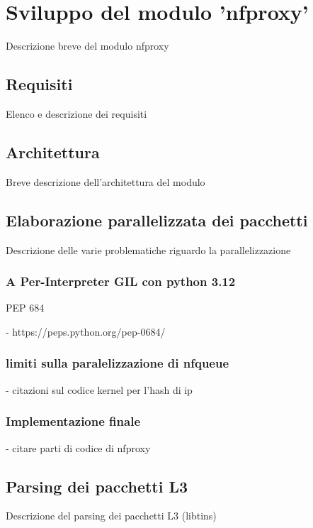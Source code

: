 \chapter{Sviluppo del modulo 'nfproxy'}

Descrizione breve del modulo nfproxy

\section{Requisiti}

Elenco e descrizione dei requisiti

\section{Architettura}

Breve descrizione dell'architettura del modulo

\section{Elaborazione parallelizzata dei pacchetti}

Descrizione delle varie problematiche riguardo la parallelizzazione

\subsection{A Per-Interpreter GIL con python 3.12}

PEP 684

- https://peps.python.org/pep-0684/

\subsection{limiti sulla paralelizzazione di nfqueue}

- citazioni sul codice kernel per l'hash di ip

\subsection{Implementazione finale}

- citare parti di codice di nfproxy

\section{Parsing dei pacchetti L3}

Descrizione del parsing dei pacchetti L3 (libtins)


